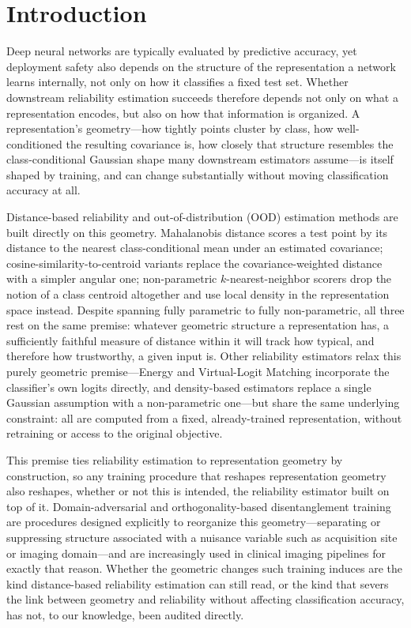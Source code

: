 \section{Introduction}
\label{sec:introduction}

Deep neural networks are typically evaluated by predictive accuracy, yet deployment safety also depends on the structure of the representation a network learns internally, not only on how it classifies a fixed test set. Whether downstream reliability estimation succeeds therefore depends not only on what a representation encodes, but also on how that information is organized. A representation's geometry---how tightly points cluster by class, how well-conditioned the resulting covariance is, how closely that structure resembles the class-conditional Gaussian shape many downstream estimators assume---is itself shaped by training, and can change substantially without moving classification accuracy at all.

Distance-based reliability and out-of-distribution (OOD) estimation methods are built directly on this geometry. Mahalanobis distance \citep{lee2018simple} scores a test point by its distance to the nearest class-conditional mean under an estimated covariance; cosine-similarity-to-centroid variants replace the covariance-weighted distance with a simpler angular one; non-parametric $k$-nearest-neighbor scorers \citep{sun2022out} drop the notion of a class centroid altogether and use local density in the representation space instead. Despite spanning fully parametric to fully non-parametric, all three rest on the same premise: whatever geometric structure a representation has, a sufficiently faithful measure of distance within it will track how typical, and therefore how trustworthy, a given input is. Other reliability estimators relax this purely geometric premise---Energy \citep{liu2020energy} and Virtual-Logit Matching \citep{wang2022vim} incorporate the classifier's own logits directly, and density-based estimators replace a single Gaussian assumption with a non-parametric one---but share the same underlying constraint: all are computed from a fixed, already-trained representation, without retraining or access to the original objective.

This premise ties reliability estimation to representation geometry by construction, so any training procedure that reshapes representation geometry also reshapes, whether or not this is intended, the reliability estimator built on top of it. Domain-adversarial and orthogonality-based disentanglement training \citep{ganin2015unsupervised} are procedures designed explicitly to reorganize this geometry---separating or suppressing structure associated with a nuisance variable such as acquisition site or imaging domain---and are increasingly used in clinical imaging pipelines for exactly that reason. Whether the geometric changes such training induces are the kind distance-based reliability estimation can still read, or the kind that severs the link between geometry and reliability without affecting classification accuracy, has not, to our knowledge, been audited directly.


